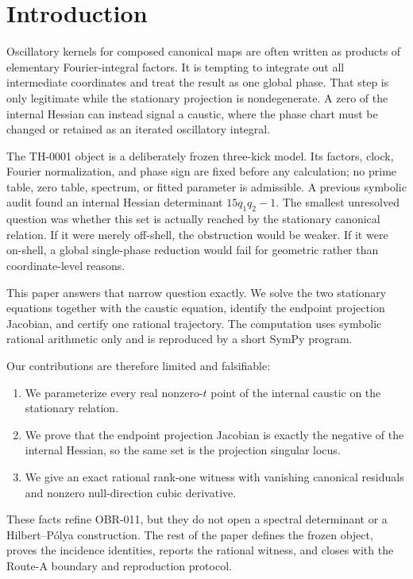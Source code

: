 \section{Introduction}

Oscillatory kernels for composed canonical maps are often written as products
of elementary Fourier-integral factors.  It is tempting to integrate out all
intermediate coordinates and treat the result as one global phase.  That step
is only legitimate while the stationary projection is nondegenerate.  A zero
of the internal Hessian can instead signal a caustic, where the phase chart
must be changed or retained as an iterated oscillatory integral.

The TH-0001 object is a deliberately frozen three-kick model.  Its factors,
clock, Fourier normalization, and phase sign are fixed before any calculation;
no prime table, zero table, spectrum, or fitted parameter is admissible.  A
previous symbolic audit found an internal Hessian determinant
\(15q_1q_2-1\).  The smallest unresolved question was whether this set is
actually reached by the stationary canonical relation.  If it were merely
off-shell, the obstruction would be weaker.  If it were on-shell, a global
single-phase reduction would fail for geometric rather than coordinate-level
reasons.

This paper answers that narrow question exactly.  We solve the two stationary
equations together with the caustic equation, identify the endpoint projection
Jacobian, and certify one rational trajectory.  The computation uses symbolic
rational arithmetic only and is reproduced by a short SymPy program.

Our contributions are therefore limited and falsifiable:
\begin{enumerate}[leftmargin=1.7em]
  \item We parameterize every real nonzero-\(t\) point of the internal caustic
        on the stationary relation.
  \item We prove that the endpoint projection Jacobian is exactly the negative
        of the internal Hessian, so the same set is the projection singular
        locus.
  \item We give an exact rational rank-one witness with vanishing canonical
        residuals and nonzero null-direction cubic derivative.
\end{enumerate}

These facts refine OBR-011, but they do not open a spectral determinant or a
Hilbert--P\'{o}lya construction.  The rest of the paper defines the frozen
object, proves the incidence identities, reports the rational witness, and
closes with the Route-A boundary and reproduction protocol.

